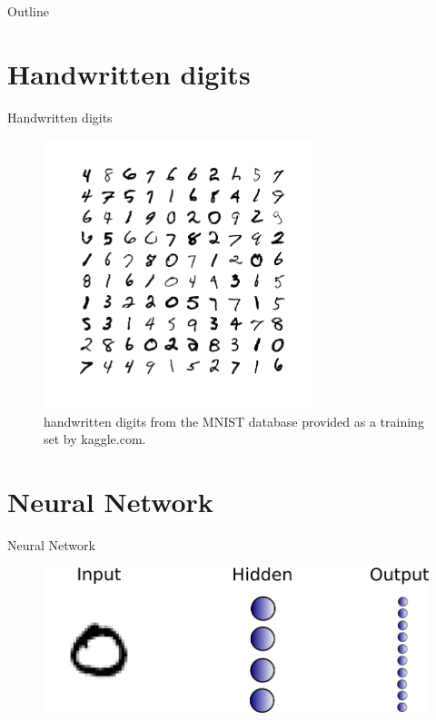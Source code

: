 


\begin{frame}[plain] 
\titlepage
\end{frame}

\begin{frame}[plain]{Outline}
\tableofcontents
\end{frame}


\section{Handwritten digits}


\begin{frame}[plain]{Handwritten digits}
\begin{figure}
\includegraphics[width=0.7\textwidth]{handwritten_digits}
\vspace{-1cm}
\caption{ handwritten digits from the MNIST database provided as a training set by kaggle.com.}
\end{figure}
\end{frame}


\section{Neural Network}


\begin{frame}[plain]{Neural Network}
\begin{figure}
\includegraphics[width = 0.8 \textwidth]{"simple neural net no lines"}
\end{figure}
\end{frame}


